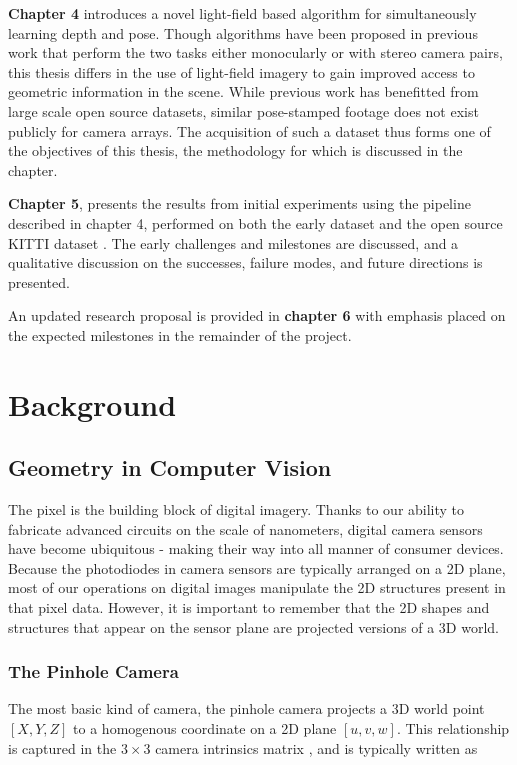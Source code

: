 \documentclass[openany]{book}
\begin{document}
\textbf{Chapter 4} introduces a novel light-field based algorithm for simultaneously learning depth and pose. Though algorithms have been proposed in previous work that perform the two tasks either monocularly or with stereo camera pairs, this thesis differs in the use of light-field imagery to gain improved access to geometric information in the scene. While previous work has benefitted from large scale open source datasets, similar pose-stamped footage does not exist publicly for camera arrays. The acquisition of such a dataset thus forms one of the objectives of this thesis, the methodology for which is discussed in the chapter.

\textbf{Chapter 5}, presents the results from initial experiments using the pipeline described in chapter 4, performed on both the early dataset and the open source KITTI dataset \cite{dataset-kitti}. The early challenges and milestones are discussed, and a qualitative discussion on the successes, failure modes, and future directions is presented. 

An updated research proposal is provided in \textbf{chapter 6} with emphasis placed on the expected milestones in the remainder of the project. 




\chapter{Background}

\section{Geometry in Computer Vision}

The pixel is the building block of digital imagery. Thanks to our ability to fabricate advanced circuits on the scale of nanometers, digital camera sensors have become ubiquitous - making their way into all manner of consumer devices. Because the photodiodes in camera sensors are typically arranged on a 2D plane, most of our operations on digital images manipulate the 2D structures present in that pixel data. However, it is important to remember that the 2D shapes and structures that appear on the sensor plane are projected versions of a 3D world. 

\subsection{The Pinhole Camera}

The most basic kind of camera, the pinhole camera projects a 3D world point $[X, Y, Z]$ to a homogenous coordinate on a 2D plane $[u, v, w]$. This relationship is captured in the $3 \times 3$ camera intrinsics matrix \cite{szeliski2010computervision}, and is typically written as 
\end{document}
